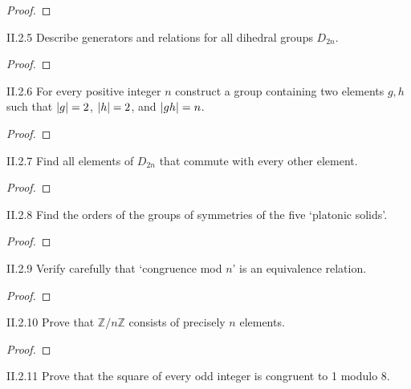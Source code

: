 \begin{proof}
\end{proof}

\begin{exercise}{II.2.5}
    Describe generators and relations for all dihedral groups $D_{2n}$.
\end{exercise}

\begin{proof}
\end{proof}

\begin{exercise}{II.2.6}
    For every positive integer $n$ construct a group containing two elements $g, h$ such that $\left\vert{g}\right\vert = 2$, $\left\vert{h}\right\vert = 2$, and $\left\vert{gh}\right\vert = n$.
\end{exercise}

\begin{proof}
\end{proof}

\begin{exercise}{II.2.7}
    Find all elements of $D_{2n}$ that commute with every other element.
\end{exercise}

\begin{proof}
\end{proof}

\begin{exercise}{II.2.8}
    Find the orders of the groups of symmetries of the five `platonic solids'.
\end{exercise}

\begin{proof}
\end{proof}

\begin{exercise}{II.2.9}
    Verify carefully that `congruence mod $n$' is an equivalence relation.
\end{exercise}

\begin{proof}
\end{proof}

\begin{exercise}{II.2.10}
    Prove that $\mathbb{Z}/n\mathbb{Z}$ consists of precisely $n$ elements.
\end{exercise}

\begin{proof}
\end{proof}

\begin{exercise}{II.2.11}
    Prove that the square of every odd integer is congruent to 1 modulo 8.
\end{exercise}


